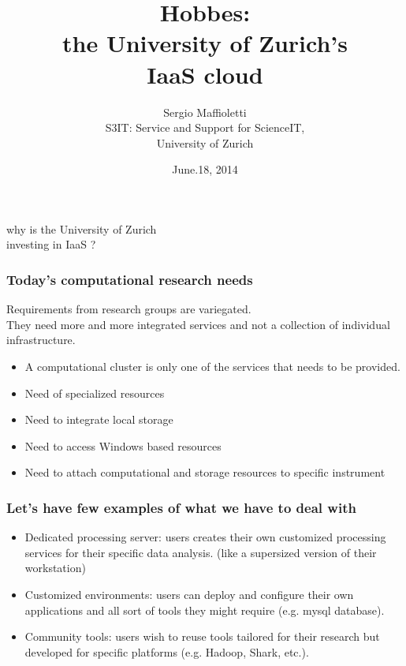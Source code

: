\documentclass[english,serif,mathserif,xcolor=pdftex,dvipsnames,table]{beamer}
\title[Cloud@UZH]{%
  Hobbes: \\
  the University of Zurich's \\ 
  IaaS cloud
}
\author[Sergio Maffioletti]{%
  Sergio Maffioletti \\
  S3IT: Service and Support for ScienceIT, \\
  University of Zurich
}
\date{June.18, 2014}
\begin{document}
\maketitle

\begin{frame}
\begin{center}
\large{why is the University of Zurich \\
      investing in IaaS ?}
\end{center}
\end{frame}

\begin{frame}
  \frametitle{Today's computational research needs}
  Requirements from research groups are variegated. \\
  They need more and more {\color{Blue}integrated services} and not a
  collection of {\color{Blue}individual} infrastructure.

  \begin{itemize}
  \item A computational cluster is {\color{Blue}only one} of the
    services that needs to be provided.
  \item Need of {\color{Blue}specialized} resources
  \item Need to integrate {\color{Blue}local storage}
  \item Need to access {\color{Blue}Windows} based resources
  \item Need to attach computational and storage resources to specific
    {\color{Blue}instrument}
  \end{itemize}
\end{frame}


\begin{frame}
  \frametitle{Let's have few examples of what we have to deal with}
  
  \begin{itemize}
  \item {\color{Blue}Dedicated processing server}: users creates their
    own customized processing services for their specific data
    analysis. (like a {\color{Blue}supersized} version of their
    {\color{Blue}workstation})
  \item {\color{Blue}Customized environments}: users can deploy and
    configure their own applications and all sort of tools they might
    require (e.g. mysql database).
  \item {\color{Blue}Community tools}: users wish to reuse tools
    tailored for their research but developed for specific platforms
    (e.g. Hadoop, Shark, etc.).
  \end{itemize}
\end{frame}
\end{document}
